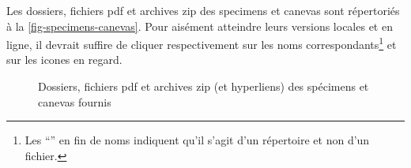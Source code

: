 Les dossiers, fichiers \acrshort{pdf} et archives \gls{zip} des specimens et
canevas sont répertoriés à la \vref{fig-specimens-canevas}. Pour aisément
atteindre leurs versions locales et en ligne, il devrait suffire de cliquer
respectivement sur les noms correspondants\footnote{Les \enquote{\folder{/}}
  en fin de noms indiquent qu'il s'agit d'un répertoire et non d'un fichier.} et
sur les icones \faExternalLink{} en regard.

\begin{figure}[ht]
  \centering
  
  \caption{Dossiers, fichiers \acrshort{pdf} et archives \gls{zip} (et
    hyperliens) des spécimens et canevas fournis}
  \label{fig-specimens-canevas}
\end{figure}


\begin{comment}
  \begin{table}[ht]
    \centering
    
    \caption{(Liens vers les )Dossiers, fichiers \acrshort{pdf} et archives \textsc{zip} des
      spécimens et canevas fournis
      avec la \yatcl{}}
    \label{tab-specimens-canevas}
  \end{table}
\end{comment}

%
\begin{comment}
  \begin{itemize}
  \item pour la distribution \TeX{} Live\versiontl, sur les systèmes :
    \begin{itemize}
    \item Linux et Mac OS X :
      \href{./.}{\folder{\unixtldirectory\tldistdirectory\jobdocdirectory/}} ;
    \item Windows :
      \href{./.}{\folder{\wintldirectory\tldistdirectory\jobdocdirectory/}} ;
    \end{itemize}
  \item pour la distribution MiK\TeX{} : \folder{\miktexdistdirectory}.
  \end{itemize}
\end{comment}

